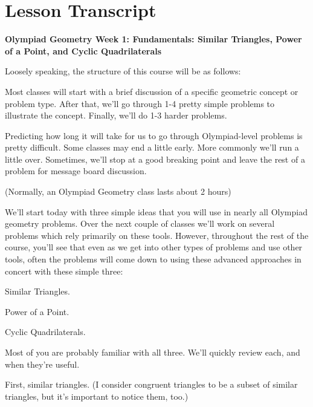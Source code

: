 \section{Lesson Transcript}
\textbf{Olympiad Geometry Week 1: Fundamentals: Similar Triangles, Power of a Point, and Cyclic Quadrilaterals}

Loosely speaking, the structure of this course will be as follows:

Most classes will start with a brief discussion of a specific geometric concept or problem type. After that, we'll go through 1-4 pretty simple problems to illustrate the concept. Finally, we'll do 1-3 harder problems.

Predicting how long it will take for us to go through Olympiad-level problems is pretty difficult. Some classes may end a little early. More commonly we'll run a little over. Sometimes, we'll stop at a good breaking point and leave the rest of a problem for message board discussion.

(Normally, an Olympiad Geometry class lasts about 2 hours)

We'll start today with three simple ideas that you will use in nearly all Olympiad geometry problems. Over the next couple of classes we'll work on several problems which rely primarily on these tools. However, throughout the rest of the course, you'll see that even as we get into other types of problems and use other tools, often the problems will come down to using these advanced approaches in concert with these simple three:

Similar Triangles.

Power of a Point.

Cyclic Quadrilaterals.

Most of you are probably familiar with all three. We'll quickly review each, and when they're useful.

First, similar triangles. (I consider congruent triangles to be a subset of similar triangles, but it's important to notice them, too.)


